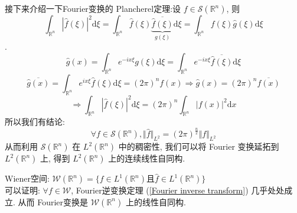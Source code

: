 \documentclass[11pt]{ctexart}[UTF8]
\begin{document}
接下来介绍一下Fourier变换的 Plancherel定理:设 $f \in \mathscr{S}(\mathbb{R}^{n})$, 则 
    $$\int_{\mathbb{R}^{n}} |\widehat{f}(\xi)|^2 \mathrm{d}\xi = \int_{\mathbb{R}^{n}} \widehat{f}(\xi)\underbrace{\overline{\widehat{f}(\xi)}}_{g(\xi)} \mathrm{d}\xi = \int_{\mathbb{R}^{n}} f(\xi)\widehat{g}(\xi) \mathrm{d}\xi$$.
\begin{equation*}
    \widehat{g}(x) = \int_{\mathbb{R}^{n}} e^{-i x  \xi} g(\xi) \mathrm{d}\xi = \int_{\mathbb{R}^{n}} e^{-i x \xi} \overline{\widehat{f}(\xi)} \mathrm{d}\xi 
\end{equation*}
\begin{equation*}
    \overline{\widehat{g}(x)} = \int_{\mathbb{R}^{n}} e^{i x \xi} \widehat{f}(\xi) \mathrm{d}\xi = (2\pi)^n f(x) \Longrightarrow \widehat{g}(x) = (2\pi)^n \overline{f(x)}
\end{equation*}
\begin{equation*}
    \Longrightarrow \int_{\mathbb{R}^{n}} |\widehat{f}(\xi)|^2 \mathrm{d}\xi = (2\pi)^n \int_{\mathbb{R}^{n}} |f(x)|^2 \mathrm{d}x
\end{equation*}
所以我们有结论:
\begin{equation*}
    \forall f \in \mathscr{S}(\mathbb{R}^{n}), \Vert \widehat{f} \Vert_{L^2} = (2\pi)^{\frac{n}{2}} \Vert f \Vert_{L^2}
\end{equation*}
从而利用 $ \mathscr{S}(\mathbb{R}^{n}) $ 在 $ L^2(\mathbb{R}^{n}) $ 中的稠密性, 我们可以将 Fourier 变换延拓到 $ L^2(\mathbb{R}^{n}) $ 上, 得到
$L^2(\mathbb{R}^{n})$ 上的连续线性自同构.
\begin{remark}
    Wiener空间: $\mathscr{W}(\mathbb{R}^{n}) = \{ f \in L^{1}(\mathbb{R}^{n}) \text{且} \widehat{f} \in L^{1}(\mathbb{R}^{n}) \}$\\
    可以证明: $\forall f \in \mathscr{W}$, Fourier逆变换定理 (\ref{Fourier inverse transform}) 几乎处处成立. 
    从而 Fourier变换是 $\mathscr{W}(\mathbb{R}^{n})$ 上的线性自同构.
\end{remark}
\end{document}
